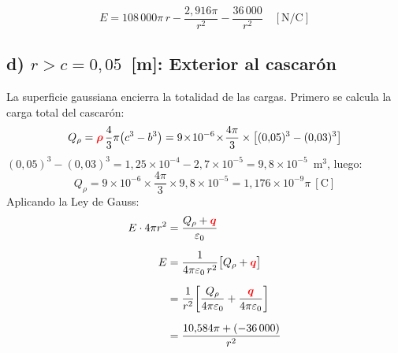 \documentclass[12pt,letterpaper]{article}
\newcommand{\qr}{{\color{red}\bm{q}}}
\newcommand{\rhor}{{\color{red}\bm{\rho}}}
\begin{document}
\[
    \boxed{E = 108\,000\pi\, r - \frac{2{,}916\pi}{r^2} - \frac{36\,000}{r^2} \quad [\text{N/C}]}
\]

\bigskip

\subsection*{d) $r > c = 0{,}05$~[m]: Exterior al cascar\'on}

\noindent
\begin{minipage}[c]{0.30\textwidth}
\centering
{}
\end{minipage}%
\hfill
\begin{minipage}[c]{0.67\textwidth}
La superficie gaussiana encierra la totalidad de las cargas. Primero se calcula
la carga total del cascar\'on:
\[
    Q_\rho = \rhor\,\frac{4}{3}\pi\bigl(c^3 - b^3\bigr)
    = 9\!\times\!10^{-6}\!\times\!\frac{4\pi}{3}
      \times\bigl[(0{,}05)^3-(0{,}03)^3\bigr]
\]
$(0{,}05)^3-(0{,}03)^3 = 1{,}25\!\times\!10^{-4}-2{,}7\!\times\!10^{-5}
    = 9{,}8\!\times\!10^{-5}$~m$^3$, luego:
\[
    Q_\rho = 9\!\times\!10^{-6}\!\times\!\frac{4\pi}{3}\!\times\!9{,}8\!\times\!10^{-5}
           = 1{,}176\!\times\!10^{-9}\pi\ [\text{C}]
\]
Aplicando la Ley de Gauss:
\begin{align*}
    E \cdot 4\pi r^2
        &= \frac{Q_\rho + \qr}{\varepsilon_0} \\[6pt]
    E   &= \frac{1}{4\pi\varepsilon_0\,r^2}\bigl[Q_\rho + \qr\bigr] \\[6pt]
        &= \frac{1}{r^2}\!\left[\frac{Q_\rho}{4\pi\varepsilon_0}
           + \frac{\qr}{4\pi\varepsilon_0}\right] \\[6pt]
        &= \frac{10{,}584\pi + (-36\,000)}{r^2}
\end{align*}
\end{minipage}
\end{document}
